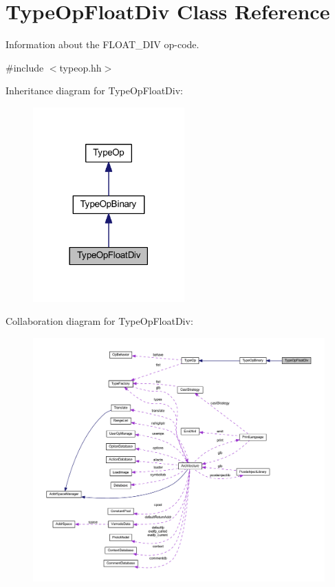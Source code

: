 \hypertarget{class_type_op_float_div}{}\section{Type\+Op\+Float\+Div Class Reference}
\label{class_type_op_float_div}


Information about the F\+L\+O\+A\+T\+\_\+\+D\+IV op-\/code.  




{\ttfamily \#include $<$typeop.\+hh$>$}



Inheritance diagram for Type\+Op\+Float\+Div\+:
\nopagebreak
\begin{figure}[H]
\begin{center}
\leavevmode
\includegraphics[width=165pt]{class_type_op_float_div__inherit__graph}
\end{center}
\end{figure}


Collaboration diagram for Type\+Op\+Float\+Div\+:
\nopagebreak
\begin{figure}[H]
\begin{center}
\leavevmode
\includegraphics[width=350pt]{class_type_op_float_div__coll__graph}
\end{center}
\end{figure}
